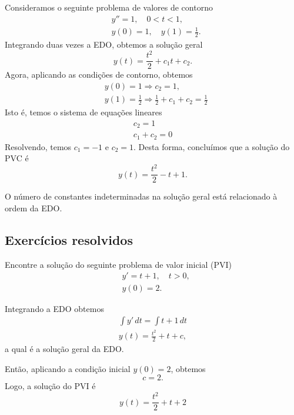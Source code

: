 \begin{ex}
  Consideramos o seguinte problema de valores de contorno
  \begin{align}
    &y'' = 1,\quad 0 < t < 1,\\
    &y(0) = 1,\quad y(1) = \frac{1}{2}.
  \end{align}
  Integrando duas vezes a EDO, obtemos a solução geral
  \begin{equation}
    y(t) = \frac{t^2}{2} + c_1t + c_2.
  \end{equation}
  Agora, aplicando as condições de contorno, obtemos
  \begin{align}
    &y(0) = 1 \Rightarrow c_2 = 1,\\
    &y(1) = \frac{1}{2} \Rightarrow \frac{1}{2} + c_1 + c_2 = \frac{1}{2}
  \end{align}
  Isto é, temos o sistema de equações lineares
  \begin{gather}
    c_2 = 1\\
    c_1 + c_2 = 0
  \end{gather}
  Resolvendo, temos $c_1=-1$ e $c_2=1$.  Desta forma, concluímos que a solução do PVC é
  \begin{equation}
    y(t) = \frac{t^2}{2} -t + 1.
  \end{equation}
\end{ex}

\begin{obs}
  O número de constantes indeterminadas na solução geral está relacionado à ordem da EDO.
\end{obs}

\subsection*{Exercícios resolvidos}

\begin{exeresol}
  Encontre a solução do seguinte problema de valor inicial (PVI)
  \begin{align}
    &y' = t + 1,\quad t>0,\\
    &y(0) = 2.
  \end{align}
\end{exeresol}
\begin{resol}
  Integrando a EDO obtemos
  \begin{gather}
    \int y'\,dt = \int t+1\,dt\\
    y(t) = \frac{t^2}{2} + t + c,
  \end{gather}
  a qual é a solução geral da EDO.

  Então, aplicando a condição inicial $y(0) = 2$, obtemos
  \begin{equation}
    c = 2.
  \end{equation}
  Logo, a solução do PVI é
  \begin{equation}
    y(t) = \frac{t^2}{2} + t + 2
  \end{equation}

\end{resol}


